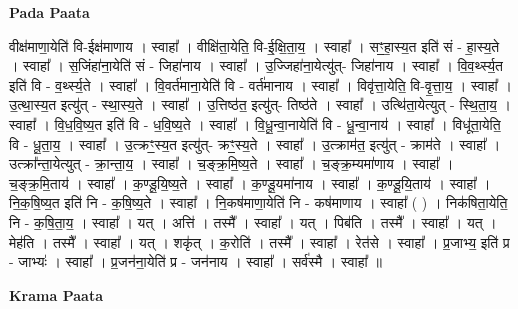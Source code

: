 \documentclass[17pt]{extarticle}
\begin{document}
\textbf{Pada Paata} \newline

वीक्ष॑माणा॒येति॑ वि-ईक्ष॑माणाय । स्वाहा᳚ । वीक्षि॑ता॒येति॒ वि-ई॒क्षि॒ता॒य॒ । स्वाहा᳚ । सꣳ॒॒हा॒स्य॒त इति॑ सं - हा॒स्य॒ते । स्वाहा᳚ । स॒जिंहा॑ना॒येति॑ सं - जिहा॑नाय । स्वाहा᳚ । उ॒ज्जिहा॑ना॒येत्यु॑त्- जिहा॑नाय । स्वाहा᳚ । वि॒व॒र्थ्स्य॒त इति॑ वि - व॒र्थ्स्य॒ते । स्वाहा᳚ । वि॒वर्त॑माना॒येति॑ वि - वर्त॑मानाय । स्वाहा᳚ । विवृ॑त्ता॒येति॒ वि-वृ॒त्ता॒य॒ । स्वाहा᳚ । उ॒त्था॒स्य॒त इत्यु॑त् - स्था॒स्य॒ते । स्वाहा᳚ । उ॒त्तिष्ठ॑त॒ इत्यु॑त्- तिष्ठ॑ते । स्वाहा᳚ । उत्थि॑ता॒येत्युत् - स्थि॒ता॒य॒ । स्वाहा᳚ । वि॒ध॒वि॒ष्य॒त इति॑ वि - ध॒वि॒ष्य॒ते । स्वाहा᳚ । वि॒धू॒न्वा॒नायेति॑ वि - धू॒न्वा॒नाय॑ । स्वाहा᳚ । विधू॑ता॒येति॒ वि - धू॒ता॒य॒ । स्वाहा᳚ । उ॒त्क्रꣳ॒॒स्य॒त इत्यु॑त्- क्रꣳ॒॒स्य॒ते । स्वाहा᳚ । उ॒त्क्राम॑त॒ इत्यु॑त् - क्राम॑ते । स्वाहा᳚ । उत्क्रा᳚न्ता॒येत्युत् - क्रा॒न्ता॒य॒ । स्वाहा᳚ । च॒ङ्क्र॒मि॒ष्य॒ते । स्वाहा᳚ । च॒ङ्क्र॒म्यमा॑णाय । स्वाहा᳚ । च॒ङ्क्र॒मि॒ताय॑ । स्वाहा᳚ । क॒ण्डू॒यि॒ष्य॒ते । स्वाहा᳚ । क॒ण्डू॒यमा॑नाय । स्वाहा᳚ । क॒ण्डू॒यि॒ताय॑ । स्वाहा᳚ । नि॒क॒षि॒ष्य॒त इति॑ नि - क॒षि॒ष्य॒ते । स्वाहा᳚ । नि॒कष॑माणा॒येति॑ नि - कष॑माणाय । स्वाहा᳚ ( ) । निक॑षिता॒येति॒ नि - क॒षि॒ता॒य॒ । स्वाहा᳚ । यत् । अत्ति॑ । तस्मै᳚ । स्वाहा᳚ । यत् । पिब॑ति । तस्मै᳚ । स्वाहा᳚ । यत् । मेह॑ति । तस्मै᳚ । स्वाहा᳚ । यत् । शकृ॑त् । क॒रोति॑ । तस्मै᳚ । स्वाहा᳚ । रेत॑से । स्वाहा᳚ । प्र॒जाभ्य॒ इति॑ प्र - जाभ्यः॑ । स्वाहा᳚ । प्र॒जन॑ना॒येति॑ प्र - जन॑नाय । स्वाहा᳚ । सर्व॑स्मै । स्वाहा᳚ ॥  \newline


\textbf{Krama Paata} \newline
\end{document}
